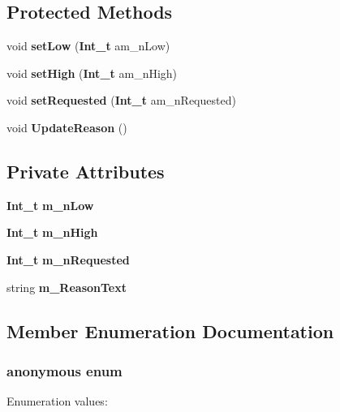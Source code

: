 \subsection*{Protected Methods}
\begin{CompactItemize}
\item 
void {\bf set\-Low} ({\bf Int\_\-t} am\_\-n\-Low)
\item 
void {\bf set\-High} ({\bf Int\_\-t} am\_\-n\-High)
\item 
void {\bf set\-Requested} ({\bf Int\_\-t} am\_\-n\-Requested)
\item 
void {\bf Update\-Reason} ()
\end{CompactItemize}
\subsection*{Private Attributes}
\begin{CompactItemize}
\item 
{\bf Int\_\-t} {\bf m\_\-n\-Low}
\item 
{\bf Int\_\-t} {\bf m\_\-n\-High}
\item 
{\bf Int\_\-t} {\bf m\_\-n\-Requested}
\item 
string {\bf m\_\-Reason\-Text}
\end{CompactItemize}


\subsection{Member Enumeration Documentation}
\subsubsection{\setlength{\rightskip}{0pt plus 5cm}anonymous enum}\label{classCRangeError_s2}


\begin{Desc}
\item[Enumeration values:]\par
\begin{description}
\item[{\em 
{\em kn\-Too\-Low}\label{classCRangeError_s2s0}
}]\item[{\em 
{\em kn\-Too\-High}\label{classCRangeError_s2s1}
}]\end{description}
\end{Desc}



